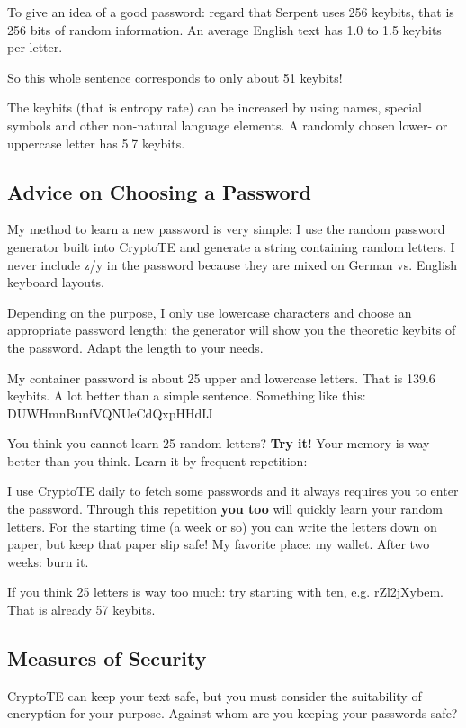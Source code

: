 \documentclass[a4paper,12pt,twoside,draft]{article}
\begin{document}
To give an idea of a good password: regard that Serpent uses 256 keybits, that is 256 bits of random information. An average English text has 1.0 to 1.5 keybits per letter.

So this whole sentence corresponds to only about 51 keybits!

The keybits (that is entropy rate) can be increased by using names, special symbols and other non-natural language elements. A randomly chosen lower- or uppercase letter has 5.7 keybits.

\subsection{Advice on Choosing a Password}\label{AdvicePassword}

My method to learn a new password is very simple: I use the random password generator built into CryptoTE and generate a string containing random letters. I never include z/y in the password because they are mixed on German vs. English keyboard layouts.

Depending on the purpose, I only use lowercase characters and choose an appropriate password length: the generator will show you the theoretic keybits of the password. Adapt the length to your needs.

My container password is about 25 upper and lowercase letters. That is 139.6 keybits. A lot better than a simple sentence. Something like this: DUWHmnBunfVQNUeCdQxpHHdIJ

You think you cannot learn 25 random letters? \textbf{Try it!} Your memory is way better than you think. Learn it by frequent repetition:

I use CryptoTE daily to fetch some passwords and it always requires you to enter the password. Through this repetition \textbf{you too} will quickly learn your random letters. For the starting time (a week or so) you can write the letters down on paper, but keep that paper slip safe! My favorite place: my wallet. After two weeks: burn it.

If you think 25 letters is way too much: try starting with ten, e.g. rZl2jXybem. That is already 57 keybits.

\subsection{Measures of Security}\label{MeasuresSecurity}

CryptoTE can keep your text safe, but you must consider the suitability of encryption for your purpose. Against whom are you keeping your passwords safe?
\end{document}
